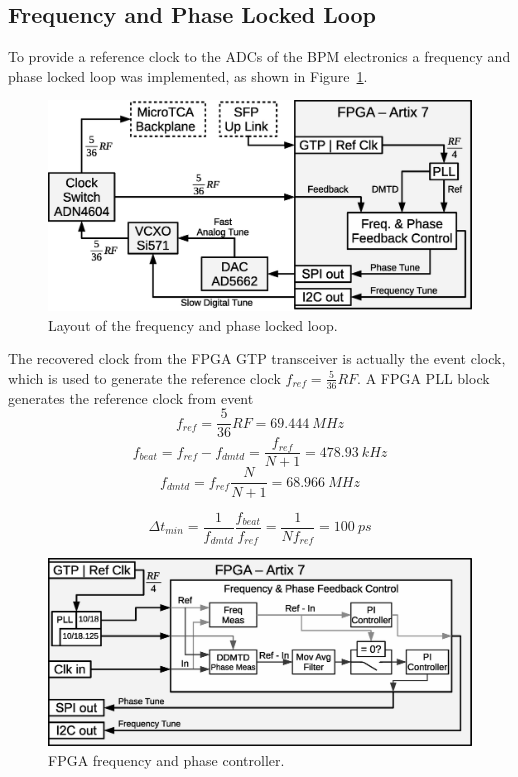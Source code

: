 \documentclass[a4paper,
               biblatex,      %
               ]{jacow}
\begin{document}
\subsection{Frequency and Phase Locked Loop}
To provide a reference clock to the ADCs of the BPM electronics a frequency and phase locked loop was implemented, as shown in Figure~\ref{fig:AFCRefClockLoop}.

\begin{figure}[!htb]
   \centering
   \includegraphics*[width=0.8\columnwidth]{AFCRefClockLoop}
   \caption{Layout of the frequency and phase locked loop.}
   \label{fig:AFCRefClockLoop}
\end{figure}

The recovered clock from the FPGA GTP transceiver is actually the event clock, which is used to generate the reference clock $f_{ref}=\frac{5}{36}RF$.
A FPGA PLL block generates the reference clock from event
\[f_{ref} = \frac{5}{36}RF = 69.444~MHz\]
\[f_{beat} = f_{ref}-f_{dmtd} = \frac{f_{ref}}{N+1} = 478.93~kHz\]
\[f_{dmtd} = f_{ref}\frac{N}{N+1} = 68.966~MHz\]

\[\Delta t_{min} = \frac{1}{f_{dmtd}}\frac{f_{beat}}{f_{ref}} = \frac{1}{Nf_{ref}} = 100~ps\]

\begin{figure}[!htb]
   \centering
   \includegraphics*[width=0.8\columnwidth]{AFCFPGADMTD}
   \caption{FPGA frequency and phase controller.}
   \label{fig:AFCFPGADMTD}
\end{figure}
\end{document}
